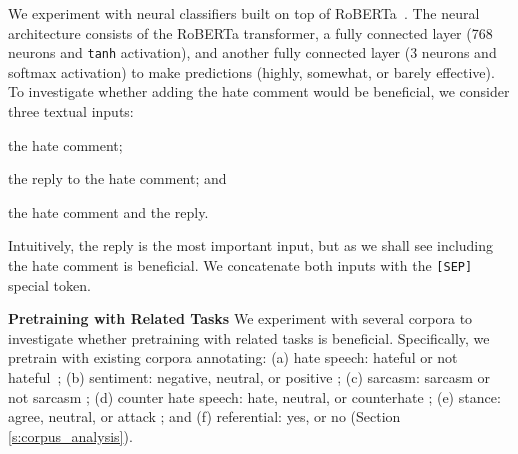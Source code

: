 \documentclass[11pt]{article}
\begin{document}
We experiment with neural classifiers built on top of RoBERTa~\cite{DBLP:journals/corr/abs-1907-11692}. 
The neural architecture consists of the RoBERTa transformer, 
a fully connected layer (768 neurons and \texttt{tanh} activation), 
and 
another fully connected layer (3 neurons and softmax activation) to make predictions (highly, somewhat, or barely effective). 
To investigate whether adding the hate comment would be beneficial, we consider three textual inputs:
\begin{compactitem}
	\item the hate comment;
	\item the reply to the hate comment; and
	\item the hate comment and the reply.
\end{compactitem}

Intuitively, the reply is the most important input, but as we shall see including the hate comment is beneficial.
We concatenate both inputs with the \texttt{[SEP]} special token. 

\noindent
\textbf{Pretraining with Related Tasks} 
We experiment with several corpora to investigate whether pretraining with related tasks is beneficial. 
Specifically, we pretrain with existing corpora annotating: 
(a) hate speech: hateful or not hateful~\cite{qian-etal-2019-benchmark,hateoffensive}; 
(b) sentiment: negative, neutral, or positive \cite{rosenthal-etal-2017-semeval}; 
(c) sarcasm: sarcasm or not sarcasm \cite{ghosh-etal-2020-report}; 
(d) counter hate speech: hate, neutral, or counterhate \cite{yu-etal-2022-hate};
(e) stance: agree, neutral, or attack \cite{pougubiyong2021debagreement};
and
(f) referential: yes, or no (Section \ref{s:corpus_analysis}).
\end{document}
